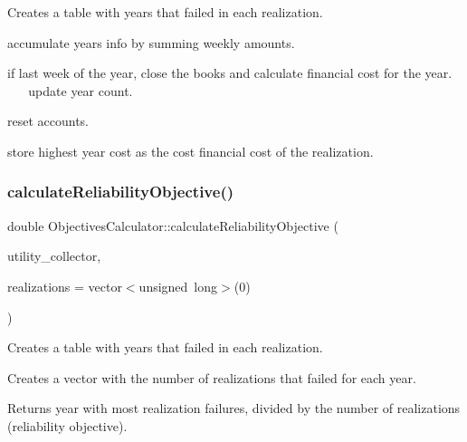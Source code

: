 Creates a table with years that failed in each realization.

accumulate year\textquotesingle{}s info by summing weekly amounts.

if last week of the year, close the books and calculate financial cost for the year. ~\newline
~\newline
~\newline
 update year count.

reset accounts.

store highest year cost as the cost financial cost of the realization. \mbox{\label{classObjectivesCalculator_a4cb12f9bb7861368c999d435477593c4}} 
\subsubsection{\texorpdfstring{calculate\+Reliability\+Objective()}{calculateReliabilityObjective()}}
{\footnotesize\ttfamily double Objectives\+Calculator\+::calculate\+Reliability\+Objective (\begin{DoxyParamCaption}\item[{const vector$<$ \mbox{\hyperlink{classUtilitiesDataCollector}{Utilities\+Data\+Collector}} $\ast$$>$ \&}]{utility\+\_\+collector,  }\item[{vector$<$ unsigned long $>$}]{realizations = {\ttfamily vector$<$unsigned~long$>$(0)} }\end{DoxyParamCaption})\hspace{0.3cm}{\ttfamily [static]}}

Creates a table with years that failed in each realization.

Creates a vector with the number of realizations that failed for each year.

Returns year with most realization failures, divided by the number of realizations (reliability objective). \mbox{\label{classObjectivesCalculator_aba30dbaf1a1520282f81c683fe00b5ed}} 
